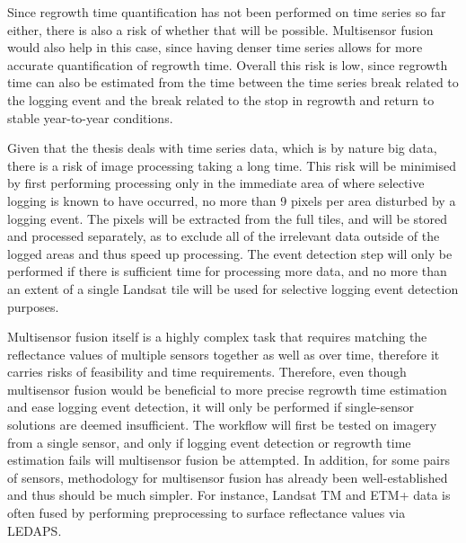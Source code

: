 \documentclass[a4paper,10pt]{article}
\begin{document}
Since regrowth time quantification has not been performed on time series so far either, there is also a risk of whether that will be possible. Multisensor fusion would also help in this case, since having denser time series allows for more accurate quantification of regrowth time. Overall this risk is low, since regrowth time can also be estimated from the time between the time series break related to the logging event and the break related to the stop in regrowth and return to stable year-to-year conditions.

Given that the thesis deals with time series data, which is by nature big data, there is a risk of image processing taking a long time. This risk will be minimised by first performing processing only in the immediate area of where selective logging is known to have occurred, no more than 9 pixels per area disturbed by a logging event. The pixels will be extracted from the full tiles, and will be stored and processed separately, as to exclude all of the irrelevant data outside of the logged areas and thus speed up processing. The event detection step will only be performed if there is sufficient time for processing more data, and no more than an extent of a single Landsat tile will be used for selective logging event detection purposes.

Multisensor fusion itself is a highly complex task that requires matching the reflectance values of multiple sensors together as well as over time, therefore it carries risks of feasibility and time requirements. Therefore, even though multisensor fusion would be beneficial to more precise regrowth time estimation and ease logging event detection, it will only be performed if single-sensor solutions are deemed insufficient. The workflow will first be tested on imagery from a single sensor, and only if logging event detection or regrowth time estimation fails will multisensor fusion be attempted. In addition, for some pairs of sensors, methodology for multisensor fusion has already been well-established and thus should be much simpler. For instance, Landsat TM and ETM+ data is often fused by performing preprocessing to surface reflectance values via LEDAPS.

\printnoidxglossary[type=acronym]


\end{document}

